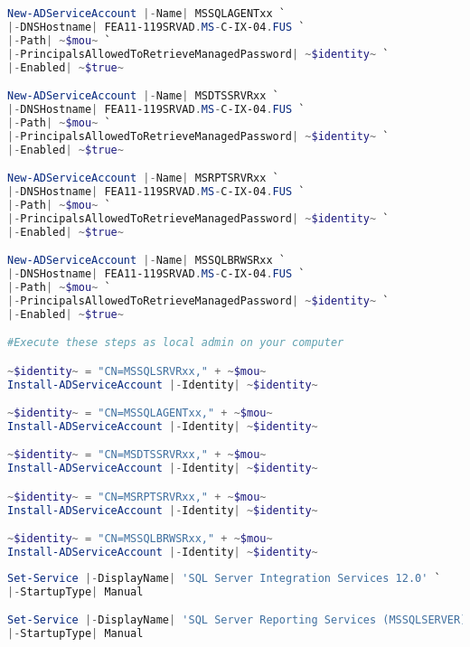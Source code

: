 \begin{enumerate}
\begin{lstlisting}[language=powershell]
New-ADServiceAccount |-Name| MSSQLAGENTxx `
|-DNSHostname| FEA11-119SRVAD.MS-C-IX-04.FUS `
|-Path| ~$mou~ `
|-PrincipalsAllowedToRetrieveManagedPassword| ~$identity~ `
|-Enabled| ~$true~

New-ADServiceAccount |-Name| MSDTSSRVRxx `
|-DNSHostname| FEA11-119SRVAD.MS-C-IX-04.FUS `
|-Path| ~$mou~ `
|-PrincipalsAllowedToRetrieveManagedPassword| ~$identity~ `
|-Enabled| ~$true~

New-ADServiceAccount |-Name| MSRPTSRVRxx `
|-DNSHostname| FEA11-119SRVAD.MS-C-IX-04.FUS `
|-Path| ~$mou~ `
|-PrincipalsAllowedToRetrieveManagedPassword| ~$identity~ `
|-Enabled| ~$true~

New-ADServiceAccount |-Name| MSSQLBRWSRxx `
|-DNSHostname| FEA11-119SRVAD.MS-C-IX-04.FUS `
|-Path| ~$mou~ `
|-PrincipalsAllowedToRetrieveManagedPassword| ~$identity~ `
|-Enabled| ~$true~

#Execute these steps as local admin on your computer

~$identity~ = "CN=MSSQLSRVRxx," + ~$mou~
Install-ADServiceAccount |-Identity| ~$identity~

~$identity~ = "CN=MSSQLAGENTxx," + ~$mou~
Install-ADServiceAccount |-Identity| ~$identity~

~$identity~ = "CN=MSDTSSRVRxx," + ~$mou~
Install-ADServiceAccount |-Identity| ~$identity~

~$identity~ = "CN=MSRPTSRVRxx," + ~$mou~
Install-ADServiceAccount |-Identity| ~$identity~

~$identity~ = "CN=MSSQLBRWSRxx," + ~$mou~
Install-ADServiceAccount |-Identity| ~$identity~
          \end{lstlisting}        
        
        \begin{lstlisting}[language=powershell, caption={Stoppen und
        umkonfigurieren von Diensten}, label=admin_03_loesung_03]
Set-Service |-DisplayName| 'SQL Server Integration Services 12.0' `
|-StartupType| Manual

Set-Service |-DisplayName| 'SQL Server Reporting Services (MSSQLSERVER)' `
|-StartupType| Manual


\end{lstlisting}
\end{enumerate}
